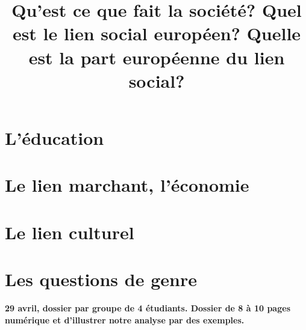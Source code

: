 \documentclass[12pt,a4paper]{report}
\begin{document}
\title{Qu'est ce que fait la société? Quel est le lien social européen? Quelle est la part européenne du lien social? } 
\maketitle

\tableofcontents








\chapter{L'éducation}
\chapter{Le lien marchant, l'économie}
\chapter{Le lien culturel}
\chapter{Les questions de genre}

\textbf{29 avril, dossier par groupe de 4 étudiants.
Dossier de 8 à 10 pages numérique et d'illustrer notre analyse par des exemples.}
\end{document}
